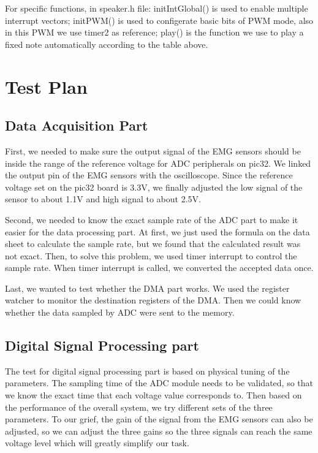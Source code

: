 \documentclass[12pt]{article}
\begin{document}
For specific functions, in speaker.h file: initIntGlobal() is used to enable multiple interrupt vectors; initPWM() is used to configerate basic bits of PWM mode, also in this PWM we use timer2 as reference; play() is the function we use to play a fixed note automatically according to the table above. 


\newpage
\section{Test Plan}
\subsection{Data Acquisition Part}

First, we needed to make sure the output signal of the EMG sensors should be inside the range of the reference voltage for ADC peripherals on pic32. We linked the output pin of the EMG sensors with the oscilloscope. Since the reference voltage set on the pic32 board is 3.3V, we finally adjusted the low signal of the sensor to about 1.1V and high signal to about 2.5V.

Second, we needed to know the exact sample rate of the ADC part to make it easier for the data processing part. At first, we just used the formula on the data sheet to calculate the sample rate, but we found that the calculated result was not exact. Then, to solve this problem, we used timer interrupt to control the sample rate. When timer interrupt is called, we converted the accepted data once.

Last, we wanted to test whether the DMA part works. We used the register watcher to monitor the destination registers of the DMA. Then we could know whether the data sampled by ADC were sent to the memory.

\subsection{Digital Signal Processing part}
The test for digital signal processing part is based on physical tuning of the parameters. The sampling time of the ADC module needs to be validated, so that we know the exact time that each voltage value corresponds to. Then based on the performance of the overall system, we try different sets of the three parameters. To our grief, the gain of the signal from the EMG sensors can also be adjusted, so we can adjust the three gains so the three signals can reach the same voltage level which will greatly simplify our task. 
\end{document}
